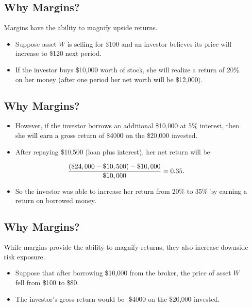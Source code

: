 \documentclass[letterpaper,10pt,english]{sphinxmanual}
\begin{document}
\subsection{Why Margins?}
\label{trading:why-margins}
Margins have the ability to magnify upside returns.
\begin{itemize}
\item {} 
Suppose asset $W$ is selling for \$100 and an investor
believes its price will increase to \$120 next period.

\end{itemize}
\begin{itemize}
\item {} 
If the investor buys \$10,000 worth of stock, she will realize a
return of 20\% on her money (after one period her net worth will be
\$12,000).

\end{itemize}


\subsection{Why Margins?}
\label{trading:id9}\begin{itemize}
\item {} 
However, if the investor borrows an additional \$10,000 at 5\%
interest, then she will earn a gross return of \$4000 on the
\$20,000 invested.

\end{itemize}
\begin{itemize}
\item {} 
After repaying \$10,500 (loan plus interest), her net return will be

\end{itemize}
\begin{gather}
\begin{split}\frac{(\$24, 000 - \$10, 500) - \$10, 000}{\$10,000} = 0.35.\end{split}\notag
\end{gather}\begin{itemize}
\item {} 
So the investor was able to increase her return from 20\% to 35\% by
earning a return on borrowed money.

\end{itemize}


\subsection{Why Margins?}
\label{trading:id10}
While margins provide the ability to magnify returns, they also
increase downside risk exposure.
\begin{itemize}
\item {} 
Suppose that after borrowing \$10,000 from the broker, the price of
asset $W$ fell from \$100 to \$80.

\end{itemize}
\begin{itemize}
\item {} 
The investor's gross return would be -\$4000 on the \$20,000
invested.

\end{itemize}
\end{document}

